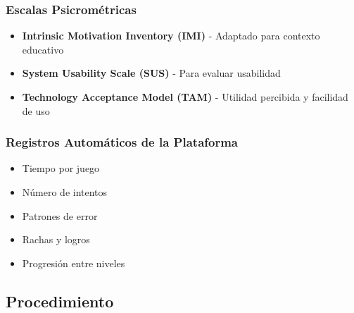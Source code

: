 \documentclass[12pt,a4paper]{article}
\begin{document}
\subsubsection{Escalas Psicrométricas}

\begin{itemize}
    \item \textbf{Intrinsic Motivation Inventory (IMI)} - Adaptado para contexto educativo
    \item \textbf{System Usability Scale (SUS)} - Para evaluar usabilidad
    \item \textbf{Technology Acceptance Model (TAM)} - Utilidad percibida y facilidad de uso
\end{itemize}

\subsubsection{Registros Automáticos de la Plataforma}

\begin{itemize}
    \item Tiempo por juego
    \item Número de intentos
    \item Patrones de error
    \item Rachas y logros
    \item Progresión entre niveles
\end{itemize}

\subsection{Procedimiento}
\end{document}
